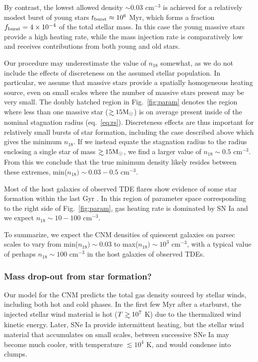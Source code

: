 \documentclass[usenatbib,fleqn]{mnras}
\newcommand\gsim{\mathrel{\rlap{\lower4pt\hbox{\hskip1pt$\sim$}}
    \raise1pt\hbox{$>$}}}
\newcommand{\Msun}{{\rm M_\odot}}
\begin{document}
By contrast, the lowest allowed density $\sim 0.03$ cm$^{-3}$ is
achieved for a relatively modest burst of young stars $t_{\rm burst}
\approx 10^{6}$ Myr, which forms a fraction $f_{\rm burst} = 4\times
10^{-4}$ of the total stellar mass. In this case the young massive
stars provide a high heating rate, while the mass injection rate is
comparatively low and receives contributions from both young and old
stars.

Our procedure may underestimate the value of $n_{18}$ somewhat, as we
do not include the effects of discreteness on the assumed stellar
population.  In particular, we assume that massive stars provide a
spatially homogeneous heating source, even on small scales where the
number of massive stars present may be very small.  The doubly hatched
region in Fig.~\ref{fig:param} denotes the region where less than one
massive star ($\gsim 15 \Msun$) is on average present inside of the
nominal stagnation radius (eq.~\ref{eq:rs}).  Discreteness effects are
thus important for relatively small bursts of star formation,
including the case described above which gives the minimum $n_{18}$.
If we instead equate the stagnation radius to the radius enclosing a
single star of mass $\gsim 15 \Msun$, we find a larger value of
$n_{18}\sim 0.5$ cm$^{-3}$.  From this we conclude that the true
minimum density likely resides between these extremes, min($n_{18})
\sim 0.03-0.5$ cm$^{-3}$.

Most of the host galaxies of observed TDE flares show evidence of some
star formation within the last Gyr \citep{French+2016}.  In this
region of parameter space corresponding to the right side of
Fig.~\ref{fig:param}, gas heating rate is dominated by SN Ia and we
expect $n_{18}\sim 10-100$ cm$^{-3}$.

To summarize, we expect the CNM densities of quiescent galaxies on
parsec scales to vary from min($n_{18}) \sim 0.03$ to max($n_{18})\sim
10^{3}$ cm$^{-3}$, with a typical value of perhaps $n_{18}\sim 100$ cm$^{-3}$
in the host galaxies of observed TDEs.

\subsubsection{Mass drop-out from star formation?}

Our model for the CNM predicts the total gas density
sourced by stellar winds, including both hot and cold phases.  In the
first few Myr after a starburst, the injected stellar wind material is hot ($T\gsim 10^{7}$ K) due to the
thermalized wind kinetic energy.  Later, SNe Ia provide intermittent heating, but the stellar wind material that accumulates on small
scales, between successive SNe Ia may become much cooler, with
temperature $\lesssim 10^{4}$ K, and would condense into clumps.
\end{document}
